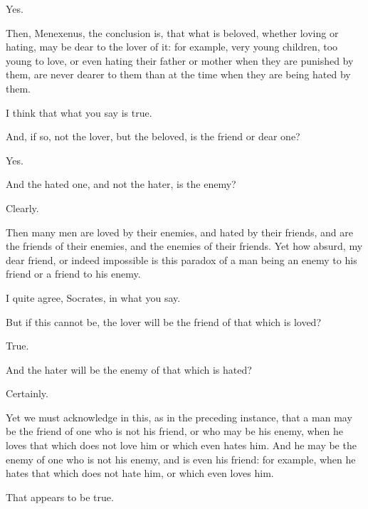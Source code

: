 \documentclass[11pt,letter]{article}
\begin{document}
\par  Yes.

\par  Then, Menexenus, the conclusion is, that what is beloved, whether loving or hating, may be dear to the lover of it: for example, very young children, too young to love, or even hating their father or mother when they are punished by them, are never dearer to them than at the time when they are being hated by them.

\par  I think that what you say is true.

\par  And, if so, not the lover, but the beloved, is the friend or dear one?

\par  Yes.

\par  And the hated one, and not the hater, is the enemy?

\par  Clearly.

\par  Then many men are loved by their enemies, and hated by their friends, and are the friends of their enemies, and the enemies of their friends. Yet how absurd, my dear friend, or indeed impossible is this paradox of a man being an enemy to his friend or a friend to his enemy.

\par  I quite agree, Socrates, in what you say.

\par  But if this cannot be, the lover will be the friend of that which is loved?

\par  True.

\par  And the hater will be the enemy of that which is hated?

\par  Certainly.

\par  Yet we must acknowledge in this, as in the preceding instance, that a man may be the friend of one who is not his friend, or who may be his enemy, when he loves that which does not love him or which even hates him. And he may be the enemy of one who is not his enemy, and is even his friend: for example, when he hates that which does not hate him, or which even loves him.

\par  That appears to be true.
\end{document}
